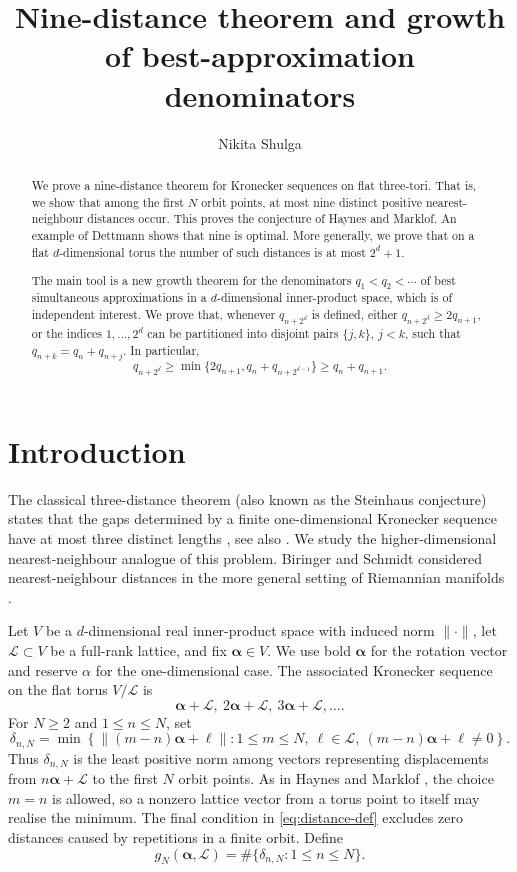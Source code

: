 \documentclass[11pt,reqno]{amsart}
\title[Nine distances and best approximations]{Nine-distance theorem and growth of best-approximation denominators}
\author[Nikita Shulga]{Nikita Shulga}
\theoremstyle{definition}
\newcommand{\0}{\mbf 0}%
\newcommand{\cL}{\mathcal L}
\newcommand{\balpha}{\boldsymbol{\alpha}}
\newcommand{\card}{\#}
\begin{document}
\begin{abstract}
We prove a nine-distance theorem for Kronecker sequences on flat three-tori.
That is, we show that among the first $N$ orbit points, at most nine distinct positive
nearest-neighbour distances occur. This proves the conjecture of Haynes and
Marklof. An example of Dettmann shows that nine is optimal. More generally, we prove that on a flat $d$-dimensional torus the number of such distances is at most
$2^d+1$.

The main tool is a new growth theorem for the denominators
$q_1<q_2<\cdots$ of best simultaneous approximations in a $d$-dimensional
inner-product space, which is of independent interest. We prove that, whenever $q_{n+2^d}$ is defined, either $q_{n+2^d}\ge2q_{n+1}$, or the indices $1,\ldots,2^d$ can be partitioned into disjoint pairs $\{j,k\}$, $j<k$, such that
$q_{n+k}=q_n+q_{n+j}$. In particular,
$$
 q_{n+2^d}\ge \min\{2q_{n+1},q_n+q_{n+2^{d-1}}\}\ge q_n+q_{n+1}.
$$
\end{abstract}

\maketitle

\section{Introduction}

The classical three-distance theorem (also known as the Steinhaus conjecture)
states that the gaps determined by a finite one-dimensional Kronecker
sequence have at most three distinct lengths
\cite{Swierczkowski1958,Slater1967}, see also
\cite{MarklofStrombergsson2017}. We study the higher-dimensional
nearest-neighbour analogue of this problem. Biringer and Schmidt considered
nearest-neighbour distances in the more general setting of Riemannian
manifolds \cite{BiringerSchmidt2008}.

Let $V$ be a $d$-dimensional real inner-product space with induced norm
$\|\cdot\|$, let $\cL\subset V$ be a full-rank lattice, and fix
$\balpha\in V$. We use bold $\balpha$ for the rotation vector and reserve
$\alpha$ for the one-dimensional case. The associated Kronecker sequence on
the flat torus $V/\cL$ is
$$
 \balpha+\cL,\ 2\balpha+\cL,\ 3\balpha+\cL,\ldots.
$$
For $N\ge2$ and $1\le n\le N$, set
\begin{equation}\label{eq:distance-def}
 \delta_{n,N}
 =\min\left\{\|(m-n)\balpha+\ell\|:
 1\le m\le N,\ \ell\in\cL,\ (m-n)\balpha+\ell\ne0\right\}.
\end{equation}
Thus $\delta_{n,N}$ is the least positive norm among vectors representing
displacements from $n\balpha+\cL$ to the first $N$ orbit points. As in Haynes
and Marklof \cite{HaynesMarklof2022}, the choice $m=n$ is allowed, so a
nonzero lattice vector from a torus point to itself may realise the minimum.
The final condition in \eqref{eq:distance-def} excludes zero distances caused
by repetitions in a finite orbit. Define
\begin{equation}\label{eq:g-def}
 g_N(\balpha,\cL)=\card\{\delta_{n,N}:1\le n\le N\}.
\end{equation}
\end{document}
